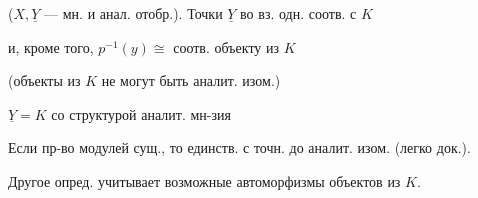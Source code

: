 ($X,\underline Y$ — мн. и анал. отобр.). Точки $\underline Y$ во вз. одн. соотв. с $K$ 



и, кроме того, $p^{-1}(y)\cong$ соотв. объекту из $K$



(объекты из $K$ не могут быть аналит. изом.)








$\underline Y=K$ со структурой аналит. мн-зия



Если пр-во модулей сущ., то единств. с точн. до аналит. изом. (легко док.).



Другое опред. учитывает возможные автоморфизмы объектов из $K$.



